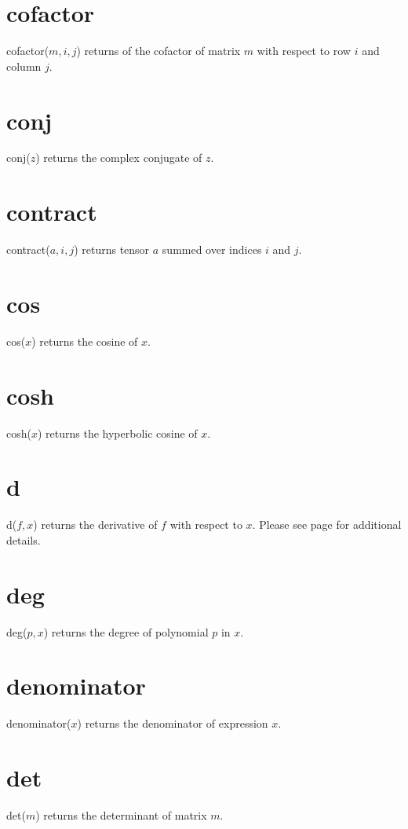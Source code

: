 \documentclass[12pt,openany]{report}
\begin{document}
\section*{cofactor}
cofactor($m,i,j$) returns of the cofactor of matrix $m$ with respect to row $i$ and column $j$.

\section*{conj}
conj($z$) returns the complex conjugate of $z$.

\section*{contract}
contract($a,i,j$) returns tensor $a$ summed over indices $i$ and $j$.

\section*{cos}
cos($x$) returns the cosine of $x$.

\section*{cosh}
cosh($x$) returns the hyperbolic cosine of $x$.

\section*{d}
d($f,x$) returns the derivative of $f$ with respect to $x$.
Please see page \pageref{d} for additional details.

\section*{deg}
deg($p,x$) returns the degree of polynomial $p$ in $x$.

\section*{denominator}
denominator($x$) returns the denominator of expression $x$.

\section*{det}
det($m$) returns the determinant of matrix $m$.
\end{document}
